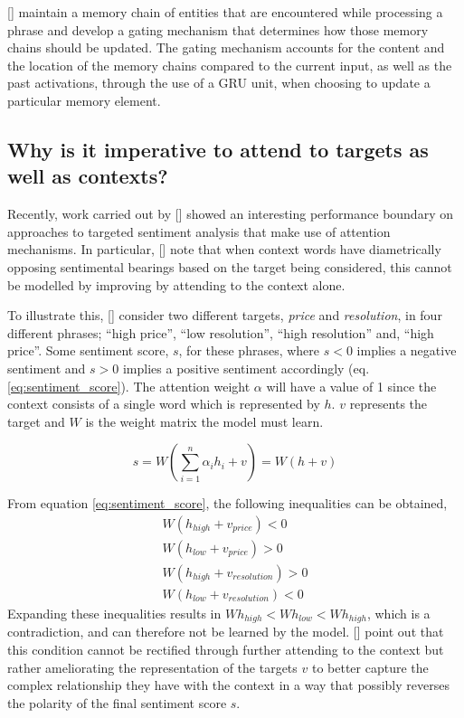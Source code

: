 \documentclass[12pt, a4paper]{report}
\theoremstyle{definition}
\theoremstyle{definition}%
\theoremstyle{definition}%
\theoremstyle{definition}%
\theoremstyle{definition}%
\theoremstyle{definition}%
\renewcommand{\cite}[1]{[\citealp{#1}]}
\begin{document}
\cite{liu2018} maintain a memory chain of entities that are encountered while processing a phrase and develop a gating mechanism that determines how those memory chains should be updated. The gating mechanism accounts for the content and the location of the memory chains compared to the current input, as well as the past activations, through the use of a GRU unit, when choosing to update a particular memory element.

\subsection{Why is it imperative to attend to targets as well as contexts?}
Recently, work carried out by \cite{wang2018} showed an interesting performance boundary on approaches to targeted sentiment analysis that make use of attention mechanisms. In particular, \cite{wang2018} note that when context words have diametrically opposing sentimental bearings based on the target being considered, this cannot be modelled by improving by attending to the context alone. 

To illustrate this, \cite{wang2018} consider two different targets, \textit{price} and \textit{resolution}, in four different phrases; \enquote{high price}, \enquote{low resolution}, \enquote{high resolution} and, \enquote{high price}. Some sentiment score, $s$, for these phrases, where $s < 0$ implies a negative sentiment and $s > 0$ implies a positive sentiment accordingly (eq. \ref{eq:sentiment_score}). The attention weight $\alpha$ will have a value of 1 since the context consists of a single word which is represented by $h$. $v$ represents the target and $W$ is the weight matrix the model must learn. 

\begin{equation} \label{eq:sentiment_score}
    s = W(\sum_{i=1}^{n}\alpha_{i}h_{i}+v) = W(h+v)
\end{equation}

From equation \ref{eq:sentiment_score}, the following inequalities can be obtained,
\begin{equation*}
\begin{split}
    W(h_{high}+v_{price}) < 0 \\
    W(h_{low}+v_{price}) > 0 \\
    W(h_{high}+v_{resolution}) > 0 \\
    W(h_{low}+v_{resolution}) < 0
\end{split}
\end{equation*}
Expanding these inequalities results in $Wh_{high}<Wh_{low}<Wh_{high}$, which is a contradiction, and can therefore not be learned by the model. \cite{wang2018} point out that this condition cannot be rectified through further attending to the context but rather ameliorating the representation of the targets $v$ to better capture the complex relationship they have with the context in a way that possibly reverses the polarity of the final sentiment score $s$.
\end{document}
